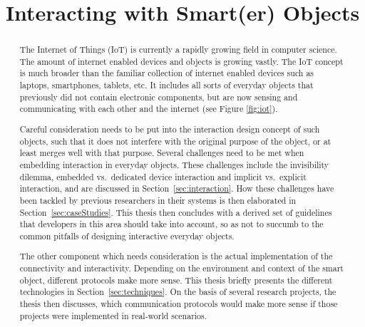 \documentclass{acm_proc_article-sp}
\begin{document}
\title{Interacting with Smart(er) Objects}
\maketitle
\begin{abstract}
The Internet of Things (IoT) is currently a rapidly growing field in computer science.
The amount of internet enabled devices and objects is growing vastly. 
The IoT concept is much broader than the familiar collection of internet enabled devices such as laptops, smartphones, tablets, etc.
It includes all sorts of everyday objects that previously did not contain electronic components, but are now sensing and communicating with each other and the internet (see Figure \ref{fig:iot}).

Careful consideration needs to be put into the interaction design concept of such objects, such that it does not interfere with the original purpose of the object, or at least merges well with that purpose.
Several challenges need to be met when embedding interaction in everyday objects.
These challenges include the invisibility dilemma, embedded vs.\ dedicated device interaction and implicit vs.\ explicit interaction, and are discussed in Section~\ref{sec:interaction}.
How these challenges have been tackled by previous researchers in their systems is then elaborated in Section~\ref{sec:caseStudies}. 
This thesis then concludes with a derived set of guidelines that developers in this area should take into account, so as not to succumb to the common pitfalls of designing interactive everyday objects.

The other component which needs consideration is the actual implementation of the connectivity and interactivity. Depending on the environment and context of the smart object, different protocols make more sense.
This thesis briefly presents the different technologies in Section~\ref{sec:techniques}.
On the basis of several research projects, the thesis then discusses, which communication protocols would make more sense if those projects were implemented in real-world scenarios.
\end{abstract}
\end{document}
